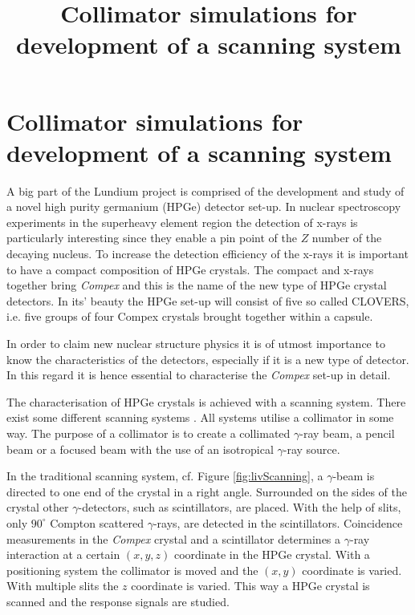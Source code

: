 \documentclass[a4paper]{article}
\title{Collimator simulations for development of a scanning system}
\begin{document}
\section{Collimator simulations for development of a scanning system}

A big part of the Lundium project is comprised of the development and study of a novel high purity germanium (HPGe) detector set-up.
In nuclear spectroscopy experiments in the superheavy element region the detection of x-rays is particularly interesting since they enable a pin point of the $Z$ number of the decaying nucleus. %
To increase the detection efficiency of the x-rays it is important to have a compact composition of HPGe crystals.
The compact and x-rays together bring \textit{Compex} and this is the name of the new type of HPGe crystal detectors.
In its' beauty the HPGe set-up will consist of five so called CLOVERS, i.e. five groups of four Compex crystals brought together within a capsule.

In order to claim new nuclear structure physics it is of utmost importance to know the characteristics of the detectors, especially if it is a new type of detector.
In this regard it is hence essential to characterise the \textit{Compex} set-up in detail.

The characterisation of HPGe crystals is achieved with a scanning system.
There exist some different scanning systems \cite{phd:Dimmock, art:Crespi, art:Domingo}.
All systems utilise a collimator in some way.
The purpose of a collimator is to create a collimated $\gamma$-ray beam, a pencil beam or a focused beam with the use of an isotropical $\gamma$-ray source.

In the traditional scanning system, cf. Figure \ref{fig:livScanning}, a $\gamma$-beam is directed to one end of the crystal in a right angle.
Surrounded on the sides of the crystal other $\gamma$-detectors, such as scintillators, are placed.
With the help of slits, only $90 ^\circ$ Compton scattered $\gamma$-rays, are detected in the scintillators.
Coincidence measurements in the \textit{Compex} crystal and a scintillator determines a $\gamma$-ray interaction at a certain $(x,y,z)$ coordinate in the HPGe crystal.
With a positioning system the collimator is moved and the $(x,y)$ coordinate is varied.
With multiple slits the $z$ coordinate is varied.
This way a HPGe crystal is scanned and the response signals are studied.
\end{document}
